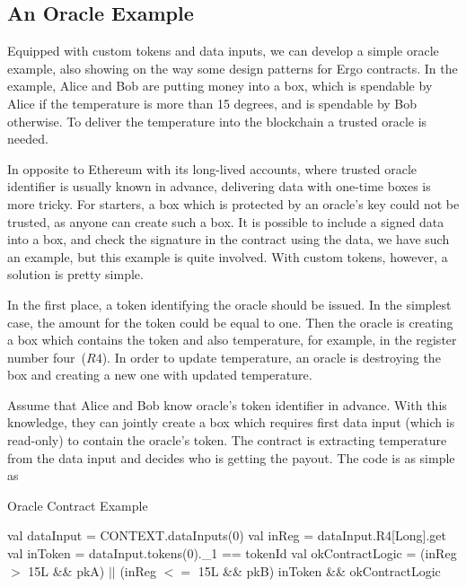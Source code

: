 \subsection{An Oracle Example}
 \label{sec:platform}


 Equipped with custom tokens and data inputs, we can develop a simple oracle example, also showing on the way some
 design patterns for Ergo contracts. In the example, Alice and Bob are putting money into a box, which is spendable by
 Alice if the temperature is more than 15 degrees, and is spendable by Bob otherwise. To deliver the temperature into the
 blockchain a trusted oracle is needed.

 In opposite to Ethereum with its long-lived accounts, where trusted oracle identifier is usually known in advance,
 delivering data with one-time boxes is more tricky. For starters, a box which is protected by an oracle's key could
 not be trusted, as anyone can create such a box. It is possible to include a signed data into a box, and check the
 signature in the contract using the data, we have such an example, but this example is quite involved. With custom
 tokens, however, a solution is pretty simple.

 In the first place, a token identifying the oracle should be issued. In the simplest case, the amount for the token could
 be equal to one. Then the oracle is creating a box which contains the token and also temperature, for example, in the
 register number four~($R4$). In order to update temperature, an oracle is destroying the box and creating a
 new one with updated temperature.

 Assume that Alice and Bob know oracle's token identifier in advance. With this knowledge, they
 can jointly create a box which requires first data input (which is read-only) to contain the oracle's token. The
 contract is extracting temperature from the data input and decides who is getting the payout. The code is as simple as


 \begin{algorithm}[H]
    \caption{Oracle Contract Example}
    \label{alg:oracle}
    \begin{algorithmic}[1]
        \State val dataInput = CONTEXT.dataInputs(0)
        \State val inReg = dataInput.R4[Long].get
        \State val inToken = dataInput.tokens(0).\_1 == tokenId
        \State val okContractLogic = (inReg $>$ 15L \&\& pkA) $||$ (inReg $<=$ 15L \&\& pkB)
        \State inToken \&\& okContractLogic
    \end{algorithmic}
 \end{algorithm}

